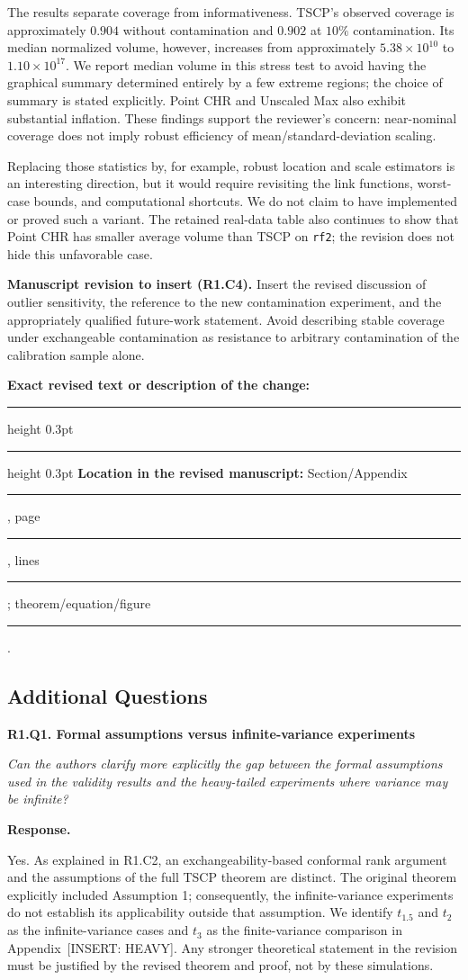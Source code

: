 \documentclass[11pt]{article}
\numberwithin{equation}{section}
\newcommand{\pending}[1]{\textcolor{AuthorRed}{[INSERT: #1]}}
\newcommand{\reviewercomment}[2]{%
  \par\medskip\noindent\textbf{#1}\par\nopagebreak
  \begingroup\color{ReviewerBlue}\itshape #2\par\endgroup
  \noindent\textbf{Response.} }
\newcommand{\revisionblock}[2]{%
  \par\begingroup\color{AuthorRed}\small
  \textbf{Manuscript revision to insert (#1).} #2\par
  \textbf{Exact revised text or description of the change:}\par
  \vspace{0.35em}\hrule height 0.3pt\vspace{1.4em}
  \hrule height 0.3pt\vspace{0.6em}
  \textbf{Location in the revised manuscript:}
  Section/Appendix \rule{1.3cm}{0.3pt},
  page \rule{1cm}{0.3pt},
  lines \rule{1.3cm}{0.3pt};
  theorem/equation/figure \rule{1.4cm}{0.3pt}.
  \par\endgroup}
\newcommand{\AppHeavy}{Appendix~\pending{HEAVY}} %
\begin{document}
The results separate coverage from informativeness. TSCP's observed
coverage is approximately $0.904$ without contamination and $0.902$
at $10\%$ contamination. Its median normalized volume, however,
increases from approximately $5.38\times10^{10}$ to
$1.10\times10^{17}$. We report median volume in this stress test to
avoid having the graphical summary determined entirely by a few extreme
regions; the choice of summary is stated explicitly. Point CHR and
Unscaled Max also exhibit substantial inflation. These findings support
the reviewer's concern: near-nominal coverage does not imply robust
efficiency of mean/standard-deviation scaling.

Replacing those statistics by, for example, robust location and scale
estimators is an interesting direction, but it would require revisiting
the link functions, worst-case bounds, and computational shortcuts.
We do not claim to have implemented or proved such a variant. The
retained real-data table also continues to show that Point CHR has
smaller average volume than TSCP on \texttt{rf2}; the revision does not
hide this unfavorable case.

\revisionblock{R1.C4}{Insert the revised discussion of outlier
sensitivity, the reference to the new contamination experiment, and
the appropriately qualified future-work statement. Avoid describing
stable coverage under exchangeable contamination as resistance to
arbitrary contamination of the calibration sample alone.}

\subsection{Additional Questions}

\reviewercomment{R1.Q1. Formal assumptions versus infinite-variance experiments}{%
Can the authors clarify more explicitly the gap between the formal
assumptions used in the validity results and the heavy-tailed
experiments where variance may be infinite?}

Yes. As explained in R1.C2, an exchangeability-based conformal rank
argument and the assumptions of the full TSCP theorem are distinct.
The original theorem explicitly included Assumption 1; consequently,
the infinite-variance experiments do not establish its applicability
outside that assumption. We identify $t_{1.5}$ and $t_2$ as the
infinite-variance cases and $t_3$ as the finite-variance comparison in
\AppHeavy{}. Any stronger theoretical statement in the revision must
be justified by the revised theorem and proof, not by these simulations.
\end{document}
